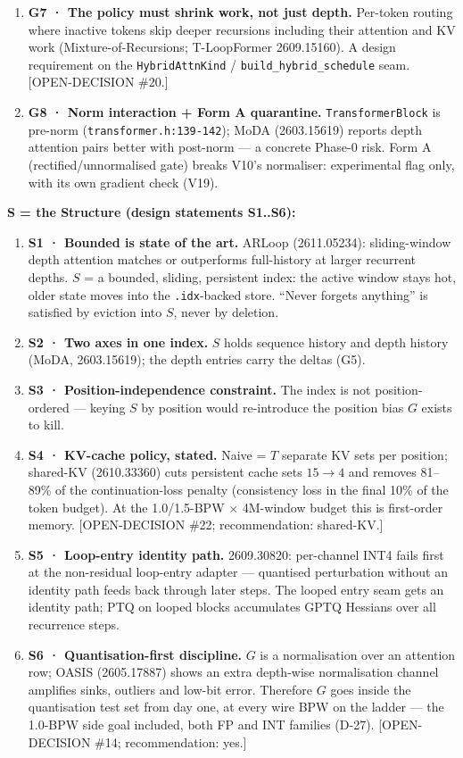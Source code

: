 \begin{enumerate}
distribution directly; the LM loss will not show the collapse.
\item \textbf{G7 · The policy must shrink work, not just depth.} Per-token routing where
inactive tokens skip deeper recursions including their attention and KV work (Mixture-of-Recursions; T-LoopFormer 2609.15160). A design requirement on the
\texttt{HybridAttnKind} / \texttt{build\_hybrid\_schedule} seam. [OPEN-DECISION \#20.]
\item \textbf{G8 · Norm interaction + Form A quarantine.} \texttt{TransformerBlock} is
pre-norm (\texttt{transformer.h:139-142}); MoDA (2603.15619) reports depth attention pairs
better with post-norm --- a concrete Phase-0 risk. Form A (rectified/unnormalised gate)
breaks V10's normaliser: experimental flag only, with its own gradient check (V19).
\end{enumerate}

\textbf{S = the Structure (design statements S1..S6):}

\begin{enumerate}
\item \textbf{S1 · Bounded is state of the art.} ARLoop (2611.05234): sliding-window depth
attention matches or outperforms full-history at larger recurrent depths. $S$ = a bounded,
sliding, persistent index: the active window stays hot, older state moves into the
\texttt{.idx}-backed store. ``Never forgets anything'' is satisfied by eviction into $S$,
never by deletion.
\item \textbf{S2 · Two axes in one index.} $S$ holds sequence history and depth history (MoDA,
2603.15619); the depth entries carry the deltas (G5).
\item \textbf{S3 · Position-independence constraint.} The index is not position-ordered ---
keying $S$ by position would re-introduce the position bias $G$ exists to kill.
\item \textbf{S4 · KV-cache policy, stated.} Naive = $T$ separate KV sets per position;
shared-KV (2610.33360) cuts persistent cache sets $15 \to 4$ and removes 81--89\% of the
continuation-loss penalty (consistency loss in the final 10\% of the token budget). At the
1.0/1.5-BPW $\times$ 4M-window budget this is first-order memory. [OPEN-DECISION \#22;
recommendation: shared-KV.]
\item \textbf{S5 · Loop-entry identity path.} 2609.30820: per-channel INT4 fails first at the
non-residual loop-entry adapter --- quantised perturbation without an identity path feeds back
through later steps. The looped entry seam gets an identity path; PTQ on looped blocks
accumulates GPTQ Hessians over all recurrence steps.
\item \textbf{S6 · Quantisation-first discipline.} $G$ is a normalisation over an attention
row; OASIS (2605.17887) shows an extra depth-wise normalisation channel amplifies sinks,
outliers and low-bit error. Therefore $G$ goes inside the quantisation test set from day one,
at every wire BPW on the ladder --- the 1.0-BPW side goal included, both FP and INT families
(D-27). [OPEN-DECISION \#14; recommendation: yes.]
\end{enumerate}

